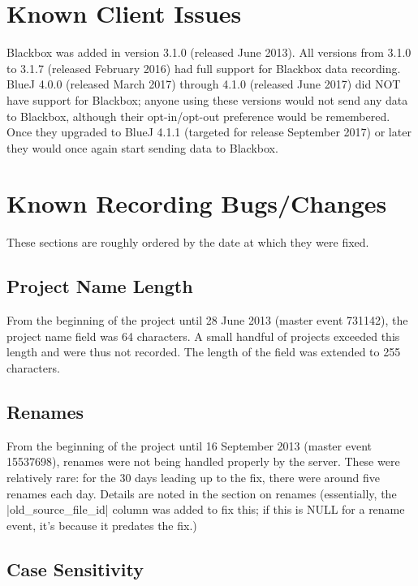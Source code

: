 \documentclass{report}
\begin{document}
\section{Known Client Issues}

Blackbox was added in version 3.1.0 (released June 2013).  All versions from 3.1.0 to 3.1.7 (released February 2016) had full support for Blackbox data recording.  BlueJ 4.0.0 (released March 2017) through 4.1.0 (released June 2017) did NOT have support for Blackbox; anyone using these versions would not send any data to Blackbox, although their opt-in/opt-out preference would be remembered.  Once they upgraded to BlueJ 4.1.1 (targeted for release September 2017) or later they would once again start sending data to Blackbox.

\section{Known Recording Bugs/Changes}

These sections are roughly ordered by the date at which they were fixed.

\subsection{Project Name Length}

From the beginning of the project until 28 June 2013 (master event 731142), the project name field was 64 characters.  A small handful of projects exceeded this length and were thus not recorded.  The length of the field was extended to 255 characters.

\subsection{Renames}

From the beginning of the project until 16 September 2013 (master event 15537698), renames were not being handled properly by the server.  These were relatively rare: for the 30 days leading up to the fix, there were around five renames each day.  Details are noted in the section on renames (essentially, the |old_source_file_id| column was added to fix this; if this is NULL for a rename event, it's because it predates the fix.)

\subsection{Case Sensitivity}
\end{document}
